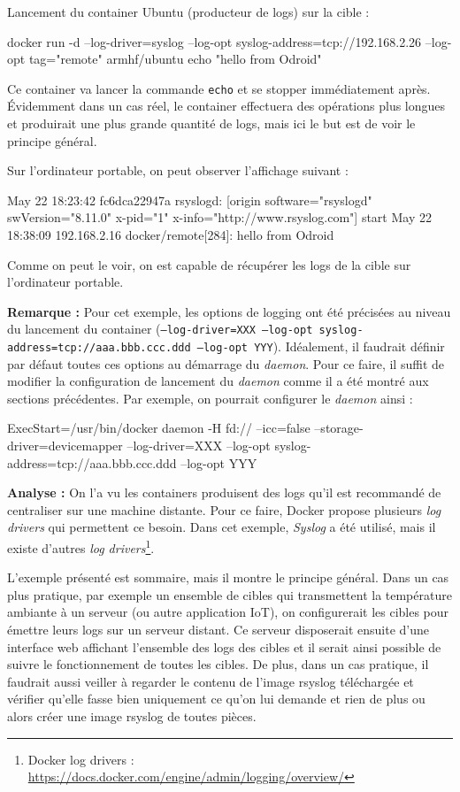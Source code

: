 \documentclass[11pt,a4paper,oneside]{report}
\newcommand{\code}[1]{\texttt{#1}}
\begin{document}
Lancement du container Ubuntu (producteur de logs) sur la cible :
\begin{bashcode}
docker run -d --log-driver=syslog --log-opt syslog-address=tcp://192.168.2.26 --log-opt tag="remote" armhf/ubuntu echo "hello from Odroid"
\end{bashcode}

Ce container va lancer la commande \code{echo} et se stopper immédiatement après. Évidemment dans un cas réel, le container effectuera des opérations plus longues et produirait une plus grande quantité de logs, mais ici le but est de voir le principe général.

Sur l'ordinateur portable, on peut observer l'affichage suivant :
\begin{bashcode}
May 22 18:23:42 fc6dca22947a rsyslogd: [origin software="rsyslogd" swVersion="8.11.0" x-pid="1" x-info="http://www.rsyslog.com"] start
May 22 18:38:09 192.168.2.16 docker/remote[284]: hello from Odroid
\end{bashcode}

Comme on peut le voir, on est capable de récupérer les logs de la cible sur l'ordinateur portable.

\textbf{Remarque : } Pour cet exemple, les options de logging ont été précisées au niveau du lancement du container (\code{--log-driver=XXX --log-opt syslog-address=tcp://aaa.bbb.ccc.ddd --log-opt YYY}). Idéalement, il faudrait définir par défaut toutes ces options au démarrage du \textit{daemon}. Pour ce faire, il suffit de modifier la configuration de lancement du \textit{daemon} comme il a été montré aux sections précédentes. Par exemple, on pourrait configurer le \textit{daemon} ainsi :

\begin{bashcode}
ExecStart=/usr/bin/docker daemon -H fd:// --icc=false --storage-driver=devicemapper --log-driver=XXX --log-opt syslog-address=tcp://aaa.bbb.ccc.ddd --log-opt YYY
\end{bashcode}

\textbf{Analyse : } On l'a vu les containers produisent des logs qu'il est recommandé de centraliser sur une machine distante. Pour ce faire, Docker propose plusieurs \textit{log drivers} qui permettent ce besoin. Dans cet exemple, \textit{Syslog} a été utilisé, mais il existe d'autres \textit{log drivers}\footnote{Docker log drivers : \url{https://docs.docker.com/engine/admin/logging/overview/}}.

L'exemple présenté est sommaire, mais il montre le principe général. Dans un cas plus pratique, par exemple un ensemble de cibles qui transmettent la température ambiante à un serveur (ou autre application IoT), on configurerait les cibles pour émettre leurs logs sur un serveur distant. Ce serveur disposerait ensuite d'une interface web affichant l'ensemble des logs des cibles et il serait ainsi possible de suivre le fonctionnement de toutes les cibles. De plus, dans un cas pratique, il faudrait aussi veiller à regarder le contenu de l'image rsyslog téléchargée et vérifier qu'elle fasse bien uniquement ce qu'on lui demande et rien de plus ou alors créer une image rsyslog de toutes pièces.
\end{document}
